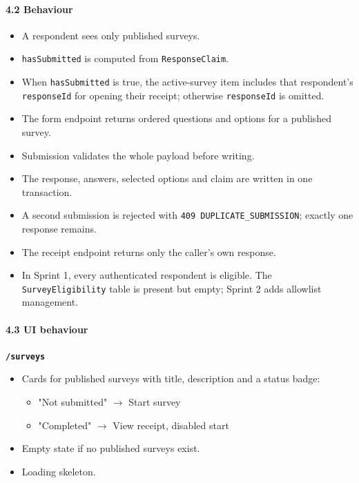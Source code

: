 \documentclass[12pt,a4paper]{article}
\begin{document}
\paragraph*{4.2 Behaviour}
\begin{itemize}[leftmargin=*]
\item A respondent sees only published surveys.
\item \texttt{hasSubmitted} is computed from \texttt{ResponseClaim}.
\item When \texttt{hasSubmitted} is true, the active-survey item includes that respondent's \texttt{responseId} for opening their receipt; otherwise \texttt{responseId} is omitted.
\item The form endpoint returns ordered questions and options for a published survey.
\item Submission validates the whole payload before writing.
\item The response, answers, selected options and claim are written in one transaction.
\item A second submission is rejected with \texttt{409 DUPLICATE\_SUBMISSION}; exactly one response remains.
\item The receipt endpoint returns only the caller's own response.
\item In Sprint 1, every authenticated respondent is eligible. The \texttt{SurveyEligibility} table is present but empty; Sprint 2 adds allowlist management.
\end{itemize}

\paragraph*{4.3 UI behaviour}
\textbf{\texttt{/surveys}}

\begin{itemize}[leftmargin=*]
\item Cards for published surveys with title, description and a status badge:
\begin{itemize}[leftmargin=*]
\item "Not submitted" $\rightarrow$ Start survey
\item "Completed" $\rightarrow$ View receipt, disabled start
\end{itemize}
\item Empty state if no published surveys exist.
\item Loading skeleton.
\end{itemize}
\end{document}
